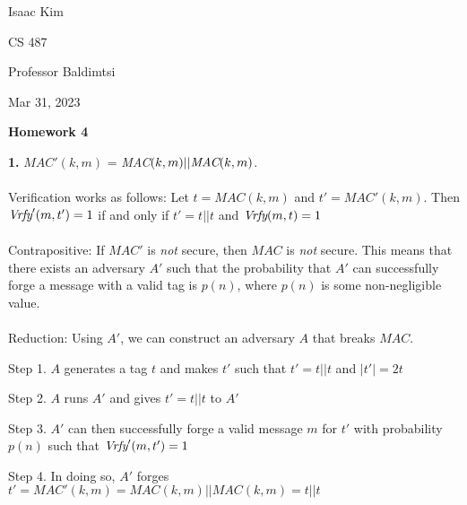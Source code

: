 \documentclass[12pt]{article}
\begin{document}
\noindent Isaac Kim

\noindent CS 487

\noindent Professor Baldimtsi

\noindent Mar 31, 2023

\begin{center} 
\textbf{Homework 4}
\end{center}

\noindent \textbf{1.} $MAC'(k,m)$ = \emph{MAC}$(k,m)||\emph{MAC}(k,m)$.
\\
\\
Verification works as follows: Let $t = MAC(k,m)$ and $t' = MAC'(k,m)$. Then $\emph{Vrfy}'(m, t')=1$ if and only if $t' = t||t$ and $\emph{Vrfy}(m,t)=1$
\\
\\
Contrapositive: If $MAC'$ is \emph{not} secure, then $MAC$ is \emph{not} secure. This means that there exists an adversary $A'$ such that the probability that $A'$ can successfully forge a message with a valid tag is $p(n)$, where $p(n)$ is some non-negligible value.
\\
\\
Reduction: Using $A'$, we can construct an adversary $A$ that breaks $MAC$.

Step 1. $A$ generates a tag $t$ and makes $t'$ such that $t' = t||t$ and $|t'| =2t$

Step 2. $A$ runs $A'$ and gives $t' = t||t$ to $A'$

Step 3. $A'$ can then successfully forge a valid message $m$ for $t'$ with probability $p(n)$ such that $\emph{Vrfy}'(m, t')=1$

Step 4. In doing so, $A'$ forges $t' = MAC'(k,m) = MAC(k,m)||MAC(k,m) = t||t$
\end{document}
